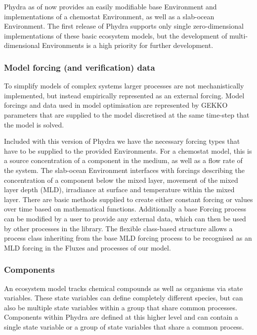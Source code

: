 \documentclass[template.tex]{subfiles}
\begin{document}
Phydra as of now provides an easily modifiable base Environment and implementations of a chemostat Environment, as well as a slab-ocean Environment. The first release of Phydra supports only single zero-dimensional implementations of these basic ecosystem models, but the development of multi-dimensional Environments is a high priority for further development.

\subsubsection{Model forcing (and verification) data} \label{Section:ForcingSection}

To simplify models of complex systems larger processes are not mechanistically implemented, but instead empirically represented as an external forcing. Model forcings and data used in model optimisation are represented by GEKKO parameters that are supplied to the model discretised at the same time-step that the model is solved.

Included with this version of Phydra we have the necessary forcing types that have to be supplied to the provided Environments. For a chemostat model, this is a source concentration of a component in the medium, as well as a flow rate of the system. The slab-ocean Environment interfaces with forcings describing the concentration of a component below the mixed layer, movement of the mixed layer depth (MLD), irradiance at surface and temperature within the mixed layer. There are basic methods supplied to create either constant forcing or values over time based on mathematical functions. Additionally a base Forcing process can be modified by a user to provide any external data, which can then be used by other processes in the library. The flexible class-based structure allows a process class inheriting from the base MLD forcing process to be recognised as an MLD forcing in the Fluxes and processes of our model.

\subsubsection{Components}

An ecosystem model tracks chemical compounds as well as organisms via state variables. These state variables can define completely different species, but can also be multiple state variables within a group that share common processes. Components within Phydra are defined at this higher level and can contain a single state variable or a group of state variables that share a common process.
\end{document}

